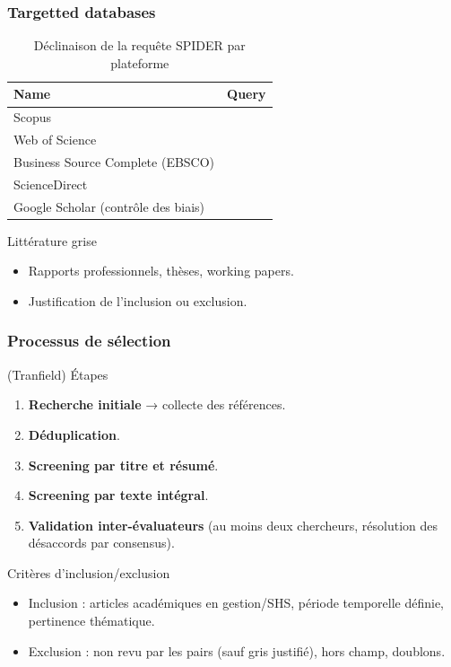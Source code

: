 \documentclass[a4paper,12pt]{article}
\begin{document}
\subsubsection{Targetted databases}
\label{sec:org85e4e24}
\begin{table}[htbp]
\caption{Déclinaison de la requête SPIDER par plateforme}
\centering
\begin{tabular}{ll}
Name & Query\\
\hline
Scopus & \\
Web of Science & \\
Business Source Complete (EBSCO) & \\
ScienceDirect & \\
Google Scholar (contrôle des biais) & \\
\end{tabular}
\end{table}

Littérature grise
\begin{itemize}
\item Rapports professionnels, thèses, working papers.
\item Justification de l’inclusion ou exclusion.
\end{itemize}
\subsubsection{Processus de sélection}
\label{sec:orgbb8ec7d}
(Tranfield)
Étapes
\begin{enumerate}
\item \textbf{\textbf{Recherche initiale}} → collecte des références.
\item \textbf{\textbf{Déduplication}}.
\item \textbf{\textbf{Screening par titre et résumé}}.
\item \textbf{\textbf{Screening par texte intégral}}.
\item \textbf{\textbf{Validation inter-évaluateurs}} (au moins deux chercheurs, résolution des désaccords par consensus).
\end{enumerate}

Critères d’inclusion/exclusion
\begin{itemize}
\item Inclusion : articles académiques en gestion/SHS, période temporelle définie, pertinence thématique.
\item Exclusion : non revu par les pairs (sauf gris justifié), hors champ, doublons.
\end{itemize}
\end{document}
